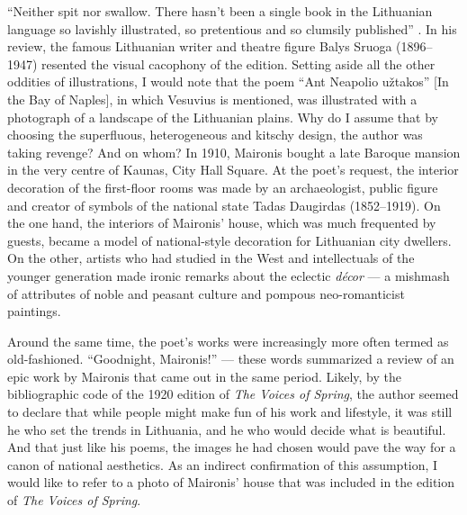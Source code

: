 \begin{paper}
``Neither spit nor swallow. There hasn't been a single book in the
\mbox{Lithuanian} language so lavishly illustrated, so pretentious and so
clumsily published'' \citep[120]{sruoga_knygoms_1920}. In his review, the famous
Lithuanian writer and theatre figure Balys Sruoga (1896--1947) resented
the visual cacophony of the edition. Setting aside all the other
oddities of illustrations, I would note that the poem ``Ant Neapolio užtakos''
[In the Bay of Naples], in which Vesuvius is mentioned, was
illustrated with a photograph of a landscape of the Lithuanian plains. 
Why do I assume that by choosing the superfluous, heterogeneous and kitschy
design, the author was taking revenge? And on whom? In 1910, Maironis bought a
late Baroque mansion in the very centre of Kaunas, City Hall Square. At
the poet's request, the interior decoration of the first-floor rooms was
made by an archaeologist, public figure and creator of symbols of the
national state Tadas Daugirdas (1852--1919). On the one hand, the
interiors of Maironis' house, which was much frequented by guests, became a model
of national-style decoration for Lithuanian city dwellers. On the other,
artists who had studied in the West and intellectuals of the younger
generation made ironic remarks about the eclectic \emph{décor} --- a mishmash of attributes of
noble and peasant culture and pompous neo-romanticist paintings.

Around the same time, the poet's works were increasingly more often
termed as old-fashioned. ``Goodnight, Maironis!'' \citep{smulkstys-paparonis_maironio_1920} --- these words summarized a review of an epic work by Maironis
that came out in the same period. Likely, by the bibliographic code of
the 1920 edition of \emph{The Voices of Spring}, the author seemed to
declare that while people might make fun of his work and lifestyle, it was still he who set the trends in Lithuania, and he who would decide what is
beautiful. And that just like his poems, the images he had chosen would pave the way for a canon of national aesthetics. As an indirect confirmation of this
assumption, I would like to refer to a photo of Maironis' house that
was included in the \citeyear{maironis_pavasario_1920} edition of \emph{The Voices of Spring}.


\end{paper}
